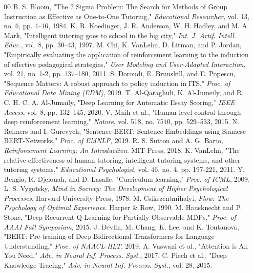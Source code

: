 \documentclass[conference]{IEEEtran}
\begin{document}
\begin{thebibliography}{00}
 B. S. Bloom, "The 2 Sigma Problem: The Search for Methods of Group Instruction as Effective as One-to-One Tutoring," \textit{Educational Researcher}, vol. 13, no. 6, pp. 4–16, 1984.
 K. R. Koedinger, J. R. Anderson, W. H. Hadley, and M. A. Mark, "Intelligent tutoring goes to school in the big city," \textit{Int. J. Artif. Intell. Educ.}, vol. 8, pp. 30–43, 1997.
 M. Chi, K. VanLehn, D. Litman, and P. Jordan, "Empirically evaluating the application of reinforcement learning to the induction of effective pedagogical strategies," \textit{User Modeling and User-Adapted Interaction}, vol. 21, no. 1-2, pp. 137–180, 2011.
 S. Doroudi, E. Brunskill, and E. Popescu, "Sequence Matters: A robust approach to policy induction in ITS," \textit{Proc. of Educational Data Mining (EDM)}, 2019.
 T. Al-Qaraghuli, K. Al-Jumeily, and R. C. H. C. A. Al-Jumaily, "Deep Learning for Automatic Essay Scoring," \textit{IEEE Access}, vol. 8, pp. 132–145, 2020.
 V. Mnih et al., "Human-level control through deep reinforcement learning," \textit{Nature}, vol. 518, no. 7540, pp. 529–533, 2015.
 N. Reimers and I. Gurevych, "Sentence-BERT: Sentence Embeddings using Siamese BERT-Networks," \textit{Proc. of EMNLP}, 2019.
 R. S. Sutton and A. G. Barto, \textit{Reinforcement Learning: An Introduction}. MIT Press, 2018.
 K. VanLehn, "The relative effectiveness of human tutoring, intelligent tutoring systems, and other tutoring systems," \textit{Educational Psychologist}, vol. 46, no. 4, pp. 197-221, 2011.
 Y. Bengio, R. Djelouah, and D. Lasalle, "Curriculum learning," \textit{Proc. of ICML}, 2009.
 L. S. Vygotsky, \textit{Mind in Society: The Development of Higher Psychological Processes}. Harvard University Press, 1978.
 M. Csikszentmihalyi, \textit{Flow: The Psychology of Optimal Experience}. Harper \& Row, 1990.
 M. Hausknecht and P. Stone, "Deep Recurrent Q-Learning for Partially Observable MDPs," \textit{Proc. of AAAI Fall Symposium}, 2015.
 J. Devlin, M. Chang, K. Lee, and K. Toutanova, "BERT: Pre-training of Deep Bidirectional Transformers for Language Understanding," \textit{Proc. of NAACL-HLT}, 2019.
 A. Vaswani et al., "Attention is All You Need," \textit{Adv. in Neural Inf. Process. Syst.}, 2017.
 C. Piech et al., "Deep Knowledge Tracing," \textit{Adv. in Neural Inf. Process. Syst.}, vol. 28, 2015.

\end{thebibliography}
\end{document}
